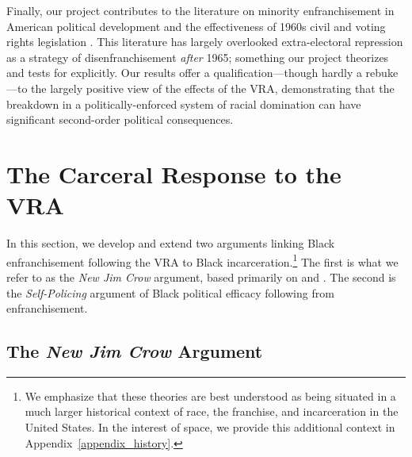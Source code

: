 \documentclass[12pt]{article}
\begin{document}
Finally, our project contributes to the literature on minority enfranchisement in American political development and the effectiveness of 1960s civil and voting rights legislation \citep{Kousser:1974ty,Grofman:1994vf,Davidson:1994ue}.  This literature has largely overlooked extra-electoral repression as a strategy of disenfranchisement \emph{after} 1965; something our project theorizes and tests for explicitly.  Our results offer a qualification---though hardly a rebuke---to the largely positive view of the effects of the VRA, demonstrating that the breakdown in a politically-enforced system of racial domination can have significant second-order political consequences.









\section{The Carceral Response to the VRA}

In this section, we develop and extend two arguments linking Black enfranchisement following the VRA to Black incarceration.\footnote{We emphasize that these theories are best understood as being situated in a much larger historical context of race, the franchise, and incarceration in the United States.  In the interest of space, we provide this additional context in Appendix~\ref{appendix_history}.}  The first is what we refer to as the \emph{New Jim Crow} argument, based primarily on \cite{Weaver:2007vr} and \cite{Alexander:2012tj}.  The second is the \emph{Self-Policing} argument of Black political efficacy following from enfranchisement.



\subsection*{The \emph{New Jim Crow} Argument}
\end{document}
